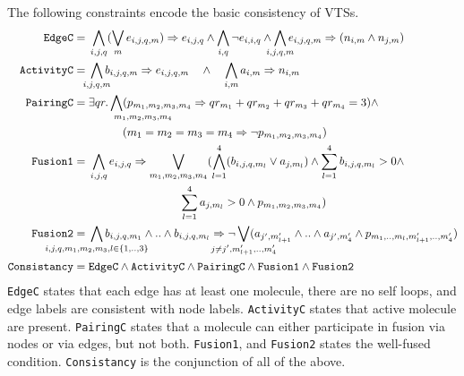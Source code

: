 The following constraints encode the basic consistency of VTSs.
\begin{align*}
  \texttt{EdgeC} =\;& \bigwedge\limits_{i,j,q} (\bigvee_m e_{i,j,q,m} )\limplies e_{i,j,q}
  \land
  \bigwedge\limits_{i,q} \neg e_{i,i,q}
  \land
  \bigwedge\limits_{\mathclap{i,j,q,m}} e_{i,j,q,m} \limplies (n_{i,m} \land n_{j,m} )
  \\
  \texttt{ActivityC} =\;&
  \bigwedge\limits_{\mathclap{i,j,q,m}} b_{i,j,q,m} \limplies e_{i,j,q,m} \quad\land\quad
  \bigwedge\limits_{i,m} a_{i,m} \limplies n_{i,m}
  \\
  \texttt{PairingC} =\;&
  \exists qr. \Land\limits_{\mathrlap{m_1,m_2,m_3,m_4}\;\;}
                         (p_{m_1,m_2,m_3,m_4} \limplies qr_{m_1} + qr_{m_2} + qr_{m_3} + qr_{m_4} = 3) \land\\ 
  & \quad\quad\quad ( m_1 = m_2 = m_3 = m_4  \limplies \lnot p_{m_1,m_2,m_3,m_4} )
  \\
  \texttt{Fusion1} =\;&
  \bigwedge\limits_{i,j,q} e_{i,j,q} \limplies
  \bigvee_{{m_1,m_2,m_3,m_4}} (\Land_{l=1}^4 ( b_{i,j,q,m_l} \lor a_{j,m_l} ) \land 
                        \sum_{l=1}^4 b_{i,j,q,m_l} > 0 \land\\
  & \qquad \qquad \qquad \qquad \sum_{l=1}^4 a_{j,m_l} > 0 \land p_{m_1,m_2,m_3,m_4})
  \\
  \texttt{Fusion2} =\;&
\bigwedge\limits_{\mathclap{i,j,q,m_1,m_2,m_3, l \in \{1,..,3\}}} b_{i,j,q,m_1} \land ..\land b_{i,j,q,m_l} \limplies \neg 
  \bigvee_{\mathclap{j \neq j^{\prime}, m_{l+1}^{\prime},..,m_{4}^{\prime}}} ( a_{j^{\prime},m_{l+1}^{\prime}} \land .. \land a_{j^{\prime},m_4^{\prime}} \land p_{m_1,..,m_l,m^{\prime}_{l+1},..,m^{\prime}_4})
  \\
  \texttt{Consistancy} =\;& \texttt{EdgeC} \land
  \texttt{ActivityC} \land \texttt{PairingC} \land
  \texttt{Fusion1} \land \texttt{Fusion2} 
\end{align*}
\texttt{EdgeC} states that each edge has at least one molecule,
there are no self loops, and edge labels are consistent with node labels.   
\texttt{ActivityC} states that active molecule are present.
\texttt{PairingC} states that a molecule can either participate in fusion
via nodes or via edges, but not both.
\texttt{Fusion1}, and \texttt{Fusion2} states the well-fused condition.
\texttt{Consistancy} is the conjunction of all of the above.

